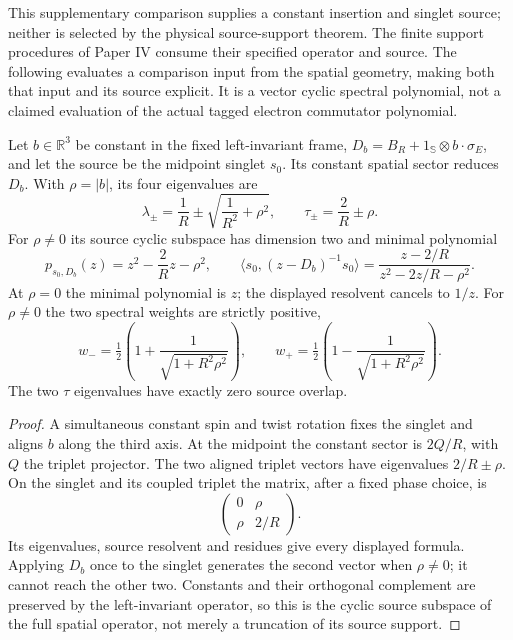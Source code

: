 \documentclass[12pt,a4paper]{article}
\begin{document}
This supplementary comparison supplies a constant insertion and singlet
source; neither is selected by the physical source-support theorem.
The finite support procedures of Paper IV consume their specified
operator and source. The following evaluates a comparison input from
the spatial geometry, making both that input and its source explicit.
It is a vector cyclic spectral polynomial, not a claimed evaluation of
the actual tagged electron commutator polynomial.

\begin{theorem}
\label{p4:thm:native-source-constant-cyclic}
Let \(b\in\mathbb R^3\) be constant in the fixed left-invariant frame,
\(D_b=B_R+1_{\mathbb S}\otimes b\cdot\sigma_E\), and let the source
be the midpoint singlet \(s_0\). Its constant spatial sector reduces
\(D_b\). With \(\rho=|b|\), its four eigenvalues are
\begin{equation}
 \lambda_\pm=\frac1R\pm\sqrt{\frac1{R^2}+\rho^2},\qquad
 \tau_\pm=\frac2R\pm\rho.
 \label{p4:eq:native-source-four-eigenvalues}
\end{equation}
For \(\rho\ne0\) its source cyclic subspace has dimension two and
minimal polynomial
\begin{equation}
 p_{s_0,D_b}(z)=z^2-\frac2Rz-\rho^2,
 \qquad
 \langle s_0,(z-D_b)^{-1}s_0\rangle
       =\frac{z-2/R}{z^2-2z/R-\rho^2}.
 \label{p4:eq:native-source-cyclic-polynomial}
\end{equation}
At \(\rho=0\) the minimal polynomial is \(z\); the displayed
resolvent cancels to \(1/z\). For \(\rho\ne0\) the two spectral
weights are strictly positive,
\begin{equation}
 w_- =\tfrac12\left(1+\frac1{\sqrt{1+R^2\rho^2}}\right),\qquad
 w_+ =\tfrac12\left(1-\frac1{\sqrt{1+R^2\rho^2}}\right).
 \label{p4:eq:native-source-cyclic-weights}
\end{equation}
The two \(\tau\) eigenvalues have exactly zero source overlap.
\end{theorem}
\begin{proof}
A simultaneous constant spin and twist rotation fixes the singlet and
aligns \(b\) along the third axis. At the midpoint the constant sector
is \(2Q/R\), with \(Q\) the triplet projector. The two aligned triplet
vectors have eigenvalues \(2/R\pm\rho\). On the singlet and its
coupled triplet the matrix, after a fixed phase choice, is
\[
 \begin{pmatrix}0&\rho\\\rho&2/R\end{pmatrix}.
\]
Its eigenvalues, source resolvent and residues give every displayed
formula. Applying \(D_b\) once to the singlet generates the second
vector when \(\rho\ne0\); it cannot reach the other two. Constants
and their orthogonal complement are preserved by the left-invariant
operator, so this is the cyclic source subspace of the full spatial
operator, not merely a truncation of its source support.
\end{proof}
\end{document}
